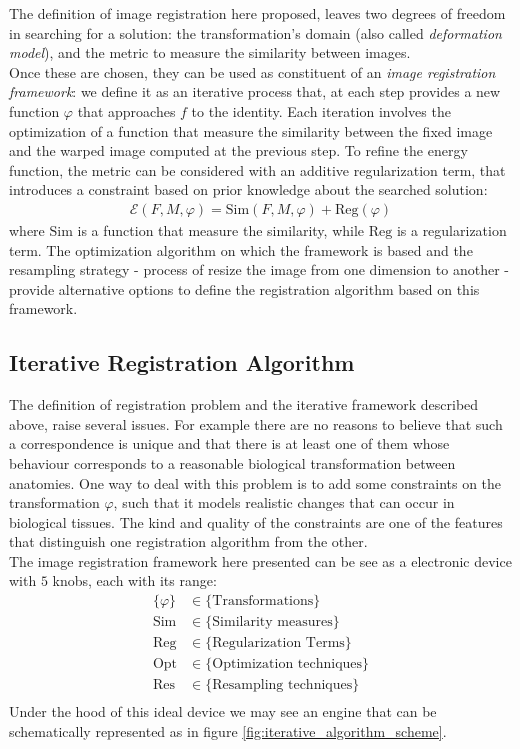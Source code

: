 The definition of image registration here proposed, leaves two degrees of freedom in searching for a solution: the transformation's domain (also called \emph{deformation model}), and the metric to measure the similarity between images. \\
Once these are chosen, they can be used as constituent of an \emph{image registration framework}: we define it as an iterative process that, at each step provides a new function $\varphi$ that approaches $f$ to the identity.
Each iteration involves the optimization of a function that measure the similarity between the fixed image and the warped image computed at the previous step. To refine the energy function, the metric can be considered with an additive regularization term, that introduces a constraint based on prior knowledge about the searched solution:
\begin{align}\label{eq:general_cost_function}
\mathcal{E}(F, M, \varphi) = \text{Sim}(F,M,\varphi) + \text{Reg}(\varphi) 
\end{align}
where $\text{Sim}$ is a function that measure the similarity, while $\text{Reg}$ is a regularization term.
The optimization algorithm on which the framework is based and the resampling strategy - process of resize the image from one dimension to another - provide alternative options to define the registration algorithm based on this framework.

\subsection{Iterative Registration Algorithm}

The definition of registration problem and the iterative framework described above, raise several issues. For example there are no reasons to believe that such a correspondence is unique and that there is at least one of them whose behaviour corresponds to a reasonable biological transformation between anatomies. One way to deal with this problem is to add some constraints on the transformation $\varphi$, such that it models realistic changes that can occur in biological tissues. The kind and quality of the constraints are one of the features that distinguish one registration algorithm from the other. \\
The image registration framework here presented can be see as a electronic device with $5$ knobs, each with its range:
\begin{align*}
\{  \varphi \} &\in \{ \text{Transformations}\}\\
\text{Sim} &\in \{ \text{Similarity measures}\}\\
\text{Reg} &\in \{ \text{Regularization Terms}\}\\
\text{Opt} &\in \{ \text{Optimization techniques}\}\\
\text{Res} &\in \{ \text{Resampling techniques}\}\\
\end{align*}
Under the hood of this ideal device we may see an engine that can be schematically represented as in figure \ref{fig:iterative_algorithm_scheme}.

